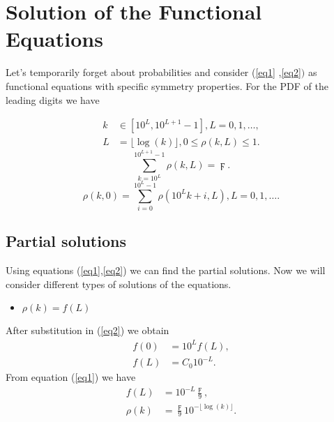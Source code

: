 \documentclass[titlepage,fleqn]{article}%
\begin{document}
\appendix


\section{Solution of the Functional Equations}%

\label{SofFE}%


Let's temporarily forget about probabilities and consider (\ref{eq1}%
,\ref{eq2}$)$ as functional equations with specific symmetry properties. For
the PDF of the leading digits we have%

\begin{align*}
k  &  \in[10^{L},10^{L+1}-1],L=0,1,\ldots,\\
L  &  =\lfloor\log(k)\rfloor,0\leq\rho(k,L)\leq1.
\end{align*}%
\begin{equation}%
{\displaystyle\sum\limits_{k=10^{L}}^{10^{L+1}-1}}
\rho(k,L)=\digamma. \label{eq1}%
\end{equation}%
\begin{equation}
\rho(k,0)=%
{\displaystyle\sum\limits_{i=0}^{10^{L}-1}}
\rho(10^{L}k+i,L),L=0,1,\ldots. \label{eq2}%
\end{equation}


\subsection{Partial solutions}%

\label{PartialSolutions}%
Using equations (\ref{eq1},\ref{eq2}) we can find the partial solutions. Now
we will consider different types of solutions of the equations.

\begin{itemize}
\item $\rho(k)=f(L)$
\end{itemize}

After substitution in (\ref{eq2}) we obtain%
\begin{align*}
f(0)  &  =10^{L}f(L),\\
f(L)  &  =C_{0}10^{-L}.
\end{align*}
From equation (\ref{eq1}) we have%
\begin{align}
f(L)  &  =10^{-L}\frac{\digamma}{9},\label{SolL}\\
\rho(k)  &  =\frac{\digamma}{9}10^{-\lfloor\log(k)\rfloor}.\nonumber
\end{align}
\end{document}

